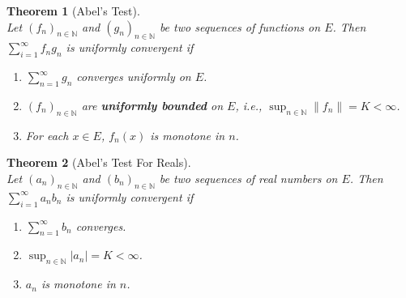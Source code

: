 \documentclass[12pt]{article}
\newtheorem{theorem}{Theorem}[section]
\theoremstyle{definition}
\begin{document}
\begin{theorem}[Abel's Test]
\hfill\\\normalfont Let $(f_n)_{n\in\mathbb{N}}$ and $(g_n)_{n\in\mathbb{N}}$ be two sequences of functions on $E$. Then $\sum_{i=1}^\infty f_ng_n$ is uniformly convergent if
\begin{enumerate}
	\item $\sum_{n=1}^\infty g_n$ converges uniformly on $E$.
	\item $(f_n)_{n\in\mathbb{N}}$ are \textbf{uniformly bounded} on $E$, i.e., $\sup_{n\in\mathbb{N}}\|f_n\|=K<\infty$.
	\item For each $x\in E$, $f_n(x)$ is monotone in $n$.
\end{enumerate}
\end{theorem}
\begin{theorem}[Abel's Test For Reals]
\hfill\\\normalfont Let $(a_n)_{n\in\mathbb{N}}$ and $(b_n)_{n\in\mathbb{N}}$ be two sequences of real numbers on $E$. Then $\sum_{i=1}^\infty a_nb_n$ is uniformly convergent if
\begin{enumerate}
	\item $\sum_{n=1}^\infty b_n$ converges.
	\item $\sup_{n\in\mathbb{N}}|a_n|=K<\infty$.
	\item $a_n$ is monotone in $n$.
\end{enumerate}
\end{theorem}
\clearpage
\end{document}
